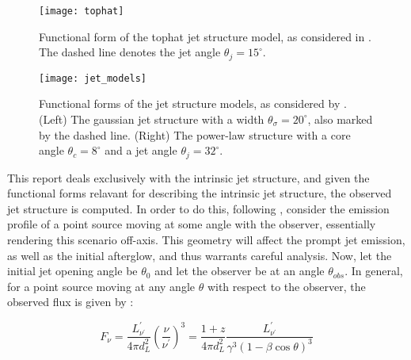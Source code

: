 \begin{itemize}
    \end{itemize}

    \begin{figure}[H]
        \centering
        \texttt{[image: tophat]}
        \caption[Tophat jet structure model]{
                    Functional form of the tophat jet structure model, as considered in
                    \cite{saleem_2020B}. The dashed line denotes the jet angle
                    $\theta_j = 15^{\circ}$.
             }
        \label{fig:tophat}
    \end{figure}

    \begin{figure}[H]
        \centering
        \texttt{[image: jet\_models]}
        \caption[Jet structures as in \cite{hayes_2020}]{
                    Functional forms of the jet structure models, as considered by
                    \cite{hayes_2020}. (Left) The gaussian jet structure with
                    a width $\theta_{\sigma} = 20^{\circ}$, also marked by the dashed
                    line. (Right) The power-law structure with a core angle $\theta_c =
                    8^\circ$ and a jet angle $\theta_j = 32^\circ$.
             }
        \label{fig:jet_models}
    \end{figure}

    This report deals exclusively with the intrinsic jet structure, and given the
    functional forms relavant for describing the intrinsic jet structure, the observed
    jet structure is computed. In order to do this, following \cite{granot_2002},
    consider the emission profile of a point source moving at some angle with the
    observer, essentially rendering this scenario off-axis. This geometry will affect
    the prompt jet emission, as well as the initial afterglow, and thus warrants careful
    analysis.  Now, let the initial jet opening angle be $\theta_0$ and let the observer
    be at an angle $\theta_{obs}$.  In general, for a point source moving at any angle
    $\theta$ with respect to the observer, the observed flux is given by :

    \begin{equation}
        \label{eq:1}
        F_{\nu} =
           \dfrac{L^{\prime}_{\nu^{\prime}}}{4 \pi d_L^2}
           \left( \dfrac{\nu}{\nu^\prime}\right)^3
                =
            \dfrac{1 + z}{4 \pi d_L^2}
            \dfrac{L^{\prime}_{\nu^{\prime}}}{\gamma^3 (1 - \beta \cos \theta)^3}
    \end{equation}

